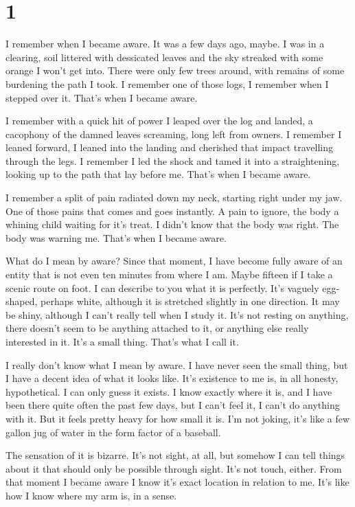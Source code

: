 \documentclass{article}
\begin{document}
\section*{1}

I remember when I became aware. It was a few days ago, maybe. I was in a
clearing, soil littered with dessicated leaves and the sky streaked with some
orange I won't get into. There were only few trees around, with remains of some
burdening the path I took. I remember one of those logs, I remember when I
stepped over it. That's when I became aware.

I remember with a quick hit of power I leaped over the log and landed, a
cacophony of the damned leaves screaming, long left from owners. I remember I
leaned forward, I leaned into the landing and cherished that impact travelling
through the legs. I remember I led the shock and tamed it into a straightening,
looking up to the path that lay before me. That's when I became aware.

I remember a split of pain radiated down my neck, starting right under my jaw.
One of those pains that comes and goes instantly. A pain to ignore, the body a
whining child waiting for it's treat. I didn't know that the body was right.
The body was warning me. That's when I became aware.

What do I mean by aware? Since that moment, I have become fully aware of an
entity that is not even ten minutes from where I am. Maybe fifteen if I take a
scenic route on foot. I can describe to you what it is perfectly. It's vaguely
egg-shaped, perhaps white, although it is stretched slightly in one direction.
It may be shiny, although I can't really tell when I study it. It's not resting
on anything, there doesn't seem to be anything attached to it, or anything else
really interested in it. It's a small thing. That's what I call it.

I really don't know what I mean by aware. I have never seen the small thing, but
I have a decent idea of what it looks like. It's existence to me is, in all
honesty, hypothetical. I can only guess it exists. I know exactly where it is,
and I have been there quite often the past few days, but I can't feel it, I
can't do anything with it. But it feels pretty heavy for how small it is. I'm
not joking, it's like a few gallon jug of water in the form factor of a baseball.

The sensation of it is bizarre. It's not sight, at all, but somehow I can tell
things about it that should only be possible through sight. It's not touch,
either. From that moment I became aware I know it's exact location in relation
to me. It's like how I know where my arm is, in a sense.
\end{document}
